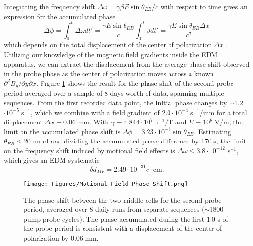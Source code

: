 \documentclass [10pt, twoside] {uwthesis}[2012/04/02]
\begin{document}
Integrating the frequency shift $\Delta\omega = \gamma \beta E \sin\theta_{EB}/c$ with respect to time gives an expression for the accumulated phase 
\begin{equation}
\Delta \phi = \int^t_0 \Delta\omega dt' = \dfrac{\gamma E \sin\theta_{EB}}{c} \int^t_0 \beta dt' =  \dfrac{\gamma E \sin\theta_{EB}\Delta x}{c^2}
\end{equation}
which depends on the total displacement of the center of polarization $\Delta x$ \cite{2013_Hg_EDM_PRA}. Utilizing our knowledge of the magnetic field gradients inside the EDM apparatus, we can extract the displacement from the average phase shift observed in the probe phase as the center of polarization moves across a known $\partial^2 B_y/\partial y \partial x.$ Figure \ref{MotionalFieldShift} shows the result for the phase shift of the second probe period averaged over a sample of 8 days worth of data, spanning multiple sequences. From the first recorded data point, the initial phase changes by $\sim$1.2$\cdot 10^{-5}$ s$^{-1}$, which we combine with a field gradient of $2.0 \cdot 10^{-4}$ s$^{-1}$/mm for a total displacement $\Delta x = 0.06$ mm. With $\gamma = 4.844 \cdot 10^7$ s$^{-1}$/T and $E = 10^6$ V/m, the limit on the accumulated phase shift is $\Delta \phi = 3.23 \cdot 10^{-8} \sin\theta_{EB}.$ Estimating $\theta_{EB} \leq 20$ mrad and dividing the accumulated phase difference by 170 s, the limit on the frequency shift induced by motional field effects is $\Delta \omega \leq 3.8 \cdot 10^{-12}$ s$^{-1}$, which gives an EDM systematic 
\begin{equation}
\delta d_{MF} = 2.49 \cdot 10^{-31} e\cdot \text{cm}.
\end{equation}

\begin{figure}
\begin{center}
\texttt{[image: Figures/Motional\_Field\_Phase\_Shift.png]}
\end{center}
\caption[Average Phase Shift $\Delta\phi_{MT_MB}(t)$]%
{\narrower The phase shift between the two middle cells for the second probe period, averaged over 8 daily runs from separate sequences ($\sim$1800 pump-probe cycles). The phase accumulated during the first 1.0 s of the probe period is consistent with a displacement of the center of polarization by 0.06 mm.}
\label{MotionalFieldShift}
\end{figure}	
\end{document}

